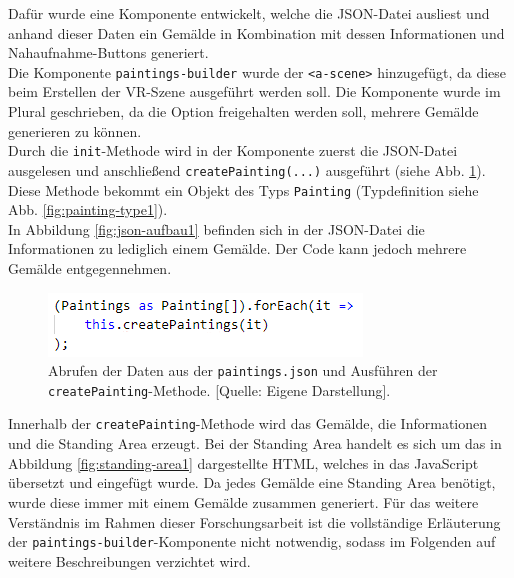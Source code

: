 \documentclass[a4paper,12pt,oneside]{article}
\begin{document}
        Dafür wurde eine 
        Komponente entwickelt,
        welche die JSON-Datei ausliest und anhand dieser Daten ein Gemälde
        in Kombination mit dessen Informationen und Nahaufnahme-Buttons generiert. \\
        Die Komponente \texttt{paintings-builder} wurde der 
        \texttt{<a-scene>} hinzugefügt, da
        diese beim Erstellen der VR-Szene ausgeführt werden soll. Die
        Komponente wurde im Plural geschrieben, da die Option freigehalten
        werden soll, mehrere Gemälde generieren zu können. \\
        Durch die \texttt{init}-Methode wird in der Komponente zuerst 
        die JSON-Datei ausgelesen und anschließend \texttt{createPainting(...)}
        ausgeführt (siehe Abb. \ref{fig:paintings-builder1}).
        Diese Methode bekommt ein Objekt des Typs \texttt{Painting}
        (Typdefinition siehe Abb. \ref{fig:painting-type1}). \\ 
        In Abbildung
        \ref{fig:json-aufbau1} befinden sich in der JSON-Datei die Informationen
        zu lediglich einem Gemälde. Der Code kann jedoch mehrere Gemälde 
        entgegennehmen.
        \begin{figure}[b]
          \centering
          \includegraphics{img/coding/paintings-builder1.png}
          \caption[Abrufen der Daten aus der \texttt{paintings.json} und Ausführen der \texttt{createPainting}-Methode.]{Abrufen der Daten aus der \texttt{paintings.json} und Ausführen der \texttt{createPainting}-Methode. [Quelle: Eigene Darstellung].}
          \label{fig:paintings-builder1}
        \end{figure} 
        Innerhalb der \texttt{createPainting}-Methode wird das Gemälde,
        die Informationen und die Standing Area erzeugt. 
        Bei der Standing Area handelt es sich um 
        das in Abbildung \ref{fig:standing-area1} dargestellte HTML, 
        welches in das JavaScript übersetzt und eingefügt wurde.
        Da jedes Gemälde eine Standing Area benötigt,
        wurde diese immer mit einem Gemälde zusammen generiert.
        Für das weitere Verständnis im Rahmen dieser Forschungsarbeit
        ist die vollständige Erläuterung der 
        \texttt{paintings-builder}-Komponente nicht notwendig,
        sodass im Folgenden auf weitere Beschreibungen verzichtet wird. \\
\end{document}
